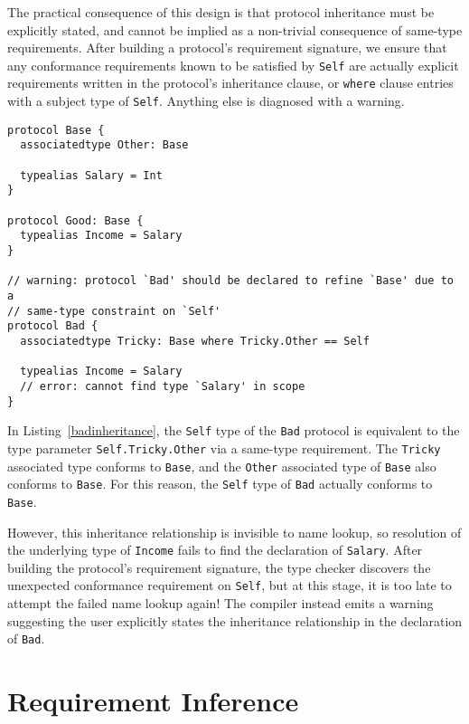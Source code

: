 \documentclass[../generics]{subfiles}
\begin{document}
The practical consequence of this design is that protocol inheritance must be explicitly stated, and cannot be implied as a non-trivial consequence of same-type requirements. After building a protocol's requirement signature, we ensure that any conformance requirements known to be satisfied by \texttt{Self} are actually explicit requirements written in the protocol's inheritance clause, or \texttt{where} clause entries with a subject type of \texttt{Self}. Anything else is diagnosed with a warning.

\begin{listing}\label{badinheritance}
\begin{Verbatim}
protocol Base {
  associatedtype Other: Base
  
  typealias Salary = Int
}

protocol Good: Base {
  typealias Income = Salary
}

// warning: protocol `Bad' should be declared to refine `Base' due to a
// same-type constraint on `Self'
protocol Bad {
  associatedtype Tricky: Base where Tricky.Other == Self
  
  typealias Income = Salary
  // error: cannot find type `Salary' in scope
}
\end{Verbatim}
\end{listing}
\begin{example}
In Listing~\ref{badinheritance}, the \texttt{Self} type of the \texttt{Bad} protocol is equivalent to the type parameter \texttt{Self.Tricky.Other} via a same-type requirement. The \texttt{Tricky} associated type conforms to \texttt{Base}, and the \texttt{Other} associated type of \texttt{Base} also conforms to \texttt{Base}. For this reason, the \texttt{Self} type of \texttt{Bad} actually conforms to \texttt{Base}.

However, this inheritance relationship is invisible to name lookup, so resolution of the underlying type of \texttt{Income} fails to find the declaration of \texttt{Salary}. After building the protocol's requirement signature, the type checker discovers the unexpected conformance requirement on \texttt{Self}, but at this stage, it is too late to attempt the failed name lookup again! The compiler instead emits a warning suggesting the user explicitly states the inheritance relationship in the declaration of \texttt{Bad}.
\end{example}

\section{Requirement Inference}\label{requirementinference}
\end{document}
